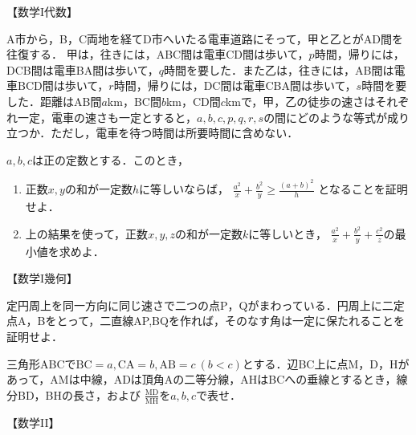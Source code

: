 \begin{center}
  【数学I代数】
\end{center}

\begin{problem}
  A市から，B，C両地を経てD市へいたる電車道路にそって，甲と乙とがAD間を往復する．
  甲は，往きには，ABC間は電車CD間は歩いて，$p$時間，帰りには，DCB間は電車BA間は歩いて，$q$時間を要した．また乙は，往きには，AB間は電車BCD間は歩いて，$r$時間，帰りには，DC間は電車CBA間は歩いて，$s$時間を要した．距離はAB間$a$km，BC間$b$km，CD間$c$kmで，甲，乙の徒歩の速さはそれぞれ一定，電車の速さも一定とすると，$a,b,c,p,q,r,s$の間にどのような等式が成り立つか．ただし，電車を待つ時間は所要時間に含めない．
\end{problem}

\begin{problem}
  $a,b,c$は正の定数とする．このとき，
  \begin{enumerate}
    \item 正数$x,y$の和が一定数$h$に等しいならば，
    $\frac{a^2}{x} + \frac  {b^2}{y} \geq \frac{(a+b)^2}{h}$
    となることを証明せよ．
    \item 上の結果を使って，正数$x,y,z$の和が一定数$k$に等しいとき，
    $\frac{a^2}{x} + \frac{b^2}{y} + \frac{c^2}{z}$の最小値を求めよ．
  \end{enumerate}
\end{problem}


\begin{center}
  【数学I幾何】
\end{center}

\begin{problem}
  定円周上を同一方向に同じ速さで二つの点P，Qがまわっている．円周上に二定点A，Bをとって，二直線AP,BQを作れば，そのなす角は一定に保たれることを証明せよ．
\end{problem}

\begin{problem}
  三角形ABCで$\mathrm{BC} = a,\mathrm{CA} = b, \mathrm{AB} = c\ (b<c)$とする．辺BC上に点M，D，Hがあって，AMは中線，ADは頂角Aの二等分線，AHはBCへの垂線とするとき，線分BD，BHの長さ，および
  $\frac{\mathrm{MD}}{\mathrm{MH}}$を$a,b,c$で表せ．
\end{problem}


\begin{center}
  【数学II】
\end{center}

